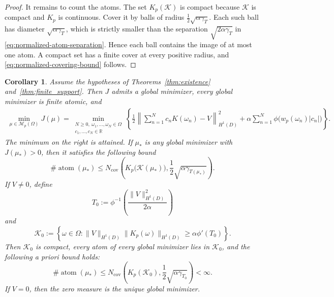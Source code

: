 \documentclass[11pt]{amsart}
\newtheorem{corollary}[theorem]{Corollary}
\theoremstyle{definition}
\theoremstyle{remark}
\DeclareMathOperator{\atom}{atom}
\begin{document}
\begin{proof}
It remains to count the atoms.  The set $K_p(\mathcal K)$ is compact because
$\mathcal K$ is compact and $K_p$ is continuous.  Cover it by balls of
radius $\frac12\sqrt{\alpha\gamma_T}$.  Each such ball has diameter
$\sqrt{\alpha\gamma_T}$, which is strictly smaller than the separation
$\sqrt{2\alpha\gamma_T}$ in
\eqref{eq:normalized-atom-separation}.  Hence each ball contains the image
of at most one atom.  A compact set has a finite cover at every positive
radius, and \eqref{eq:normalized-covering-bound} follows.
\end{proof}

\begin{corollary}
\label{cor:finite-global-minimizer}
Assume the hypotheses of Theorems~\ref{thm:existence}
and~\ref{thm:finite_support}.  Then $J$ admits a global minimizer, every
global minimizer is finite atomic, and
\begin{align}
\label{eq:attained-finite-network}
	\min_{\mu\in\mathcal M_p(\Omega)}J(\mu)
	=\min_{\substack{N\geq0,\ \omega_1,\ldots,\omega_N\in\Omega\\
		c_1,\ldots,c_N\in\mathbb R}}
	\left\{
	\frac12\left\|\sum_{n=1}^Nc_nK(\omega_n)-V\right\|_{H^1(D)}^2
	+\alpha\sum_{n=1}^N\phi\bigl(w_p(\omega_n)|c_n|\bigr)
	\right\}.
\end{align}
The minimum on the right is attained.  If $\mu_*$ is any global minimizer
with $J(\mu_*)>0$, then it satisfies the following bound
\begin{equation}
\label{eq:data-dependent-neuron-bound}
	\#\atom(\mu_*)
	\leq N_{\mathrm{cov}}\!\left(
	K_p\bigl(\mathcal K(\mu_*)\bigr),
	\frac12\sqrt{\alpha\gamma_{T(\mu_*)}}\right).
\end{equation}
If $V\neq0$, define
\begin{equation*}
	T_0:=\phi^{-1}\!\left(
	\frac{\|V\|_{H^1(D)}^2}{2\alpha}\right)
\end{equation*}
and
\begin{equation}
\label{eq:apriori-certificate-set}
	\mathcal K_0
	:=\left\{\omega\in\Omega:
	\|V\|_{H^1(D)}\|K_p(\omega)\|_{H^1(D)}
	\geq\alpha\phi'(T_0)\right\}.
\end{equation}
Then $\mathcal K_0$ is compact, every atom of every global minimizer lies in
$\mathcal K_0$, and the following a priori bound holds:
\begin{equation}
\label{eq:apriori-neuron-bound}
	\#\atom(\mu_*)
	\leq N_{\mathrm{cov}}\!\left(
	K_p(\mathcal K_0),\frac12\sqrt{\alpha\gamma_{T_0}}\right)
	<\infty.
\end{equation}
If $V=0$, then the zero measure is the unique global minimizer.
\end{corollary}
\end{document}
